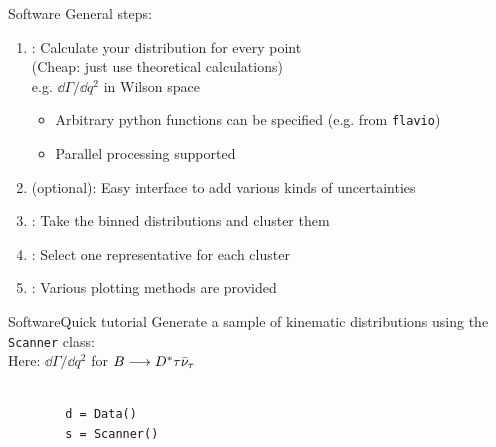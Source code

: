 \begin{frame}{Software}
    General steps:
    \begin{enumerate}
        \item {}: Calculate your distribution for every point\\ (Cheap: just use theoretical calculations)\\
        {\footnotesize e.g. $\dd\Gamma/\dd q^2$ in Wilson space}
        \begin{itemize}
            \item Arbitrary python functions can be specified (e.g. from \texttt{flavio})
            \item Parallel processing supported
        \end{itemize}
        \item {} (optional): Easy interface to add various kinds of uncertainties\\
        \item {}: Take the binned distributions and cluster them\\
        \item {}: Select one representative for each cluster
        \item {}: Various plotting methods are provided
    \end{enumerate}
\end{frame}

\begin{frame}[t, fragile]{Software}{Quick tutorial}
    Generate a sample of kinematic distributions using the \texttt{Scanner} class:\\
    {\footnotesize Here: $\dd\Gamma/\dd q^2$ for $B\longrightarrow D^*\tau\bar\nu_\tau$}
    
    \begin{verbatim}
    
        d = Data()
        s = Scanner()
    \end{verbatim}

\end{frame}

